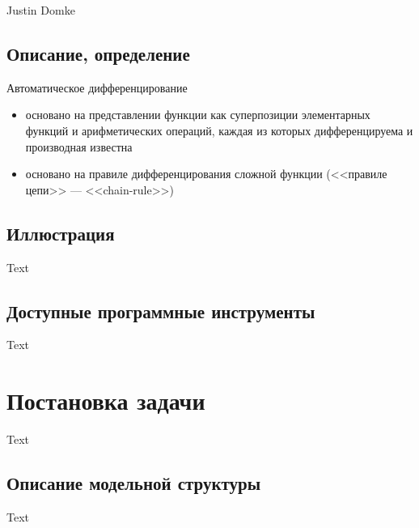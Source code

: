 \documentclass{beamer}
\begin{document}
\begin{frame}{\secname}{\subsecname}
  Justin Domke
\end{frame}


\subsection{Описание, определение}

\begin{frame}{\secname}{\subsecname}
  Автоматическое дифференцирование
  \begin{itemize}
	\item основано на представлении функции как суперпозиции элементарных
	  функций и арифметических операций, каждая из которых дифференцируема и
	  производная известна
	\item основано на правиле дифференцирования сложной функции (<<правиле
	  цепи>> --- <<chain-rule>>)
  \end{itemize}
\end{frame}


\subsection{Иллюстрация}

\begin{frame}{\secname}{\subsecname}
  Text
\end{frame}


\subsection{Доступные программные инструменты}

\begin{frame}{\secname}{\subsecname}
  Text
\end{frame}


\section{Постановка задачи}

\begin{frame}{\secname}
  Text
\end{frame}


\subsection{Описание модельной структуры}

\begin{frame}{\secname}{\subsecname}
  Text
\end{frame}
\end{document}
